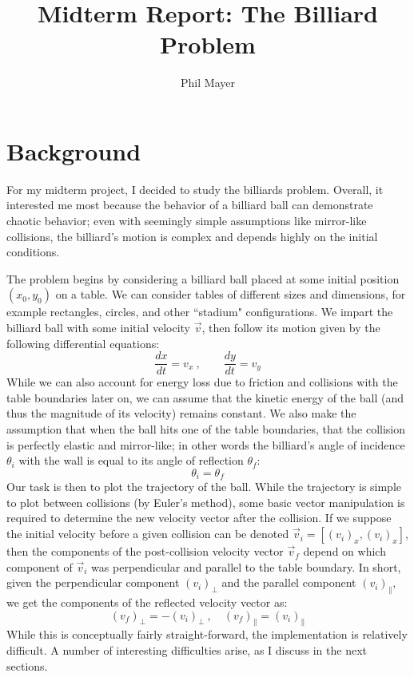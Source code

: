 \documentclass[12pt]{amsart}
\title{Midterm Report: The Billiard Problem}
\author{Phil Mayer}
\begin{document}
\maketitle

\section{Background}
For my midterm project, I decided to study the billiards problem. Overall, it interested me most because the behavior of a billiard ball can
demonstrate chaotic behavior; even with seemingly simple assumptions like mirror-like collisions, the billiard's motion is complex and depends
highly on the initial conditions. 

The problem begins by considering a billiard ball placed at some initial position $(x_0, y_0)$ on a table. We can consider tables of different sizes
and dimensions, for example rectangles, circles, and other ``stadium" configurations. We impart the billiard ball with some initial velocity 
$\vec{v}$, then follow its motion given by the following differential equations:
\[
	\frac{dx}{dt} = v_x \: , \qquad
	\frac{dy}{dt} = v_y
\]
\newline
While we can also account for energy loss due to friction and collisions with the table boundaries later on, we can assume that the kinetic
energy of the ball (and thus the magnitude of its velocity) remains constant. We also make the assumption that when the ball hits one of the
table boundaries, that the collision is perfectly elastic and mirror-like; in other words the billiard's angle of incidence $\theta_i$ with the wall is
equal to its angle of reflection $\theta_f$:
\[
	\theta_i = \theta_f
\]
\newline
Our task is then to plot the trajectory of the ball. While the trajectory is simple to plot between collisions (by Euler's method), some basic vector
manipulation is required to determine the new velocity vector after the collision. If we suppose the initial velocity before a given collision
can be denoted $\vec{v}_i = [ (v_i)_x, (v_i)_x ]$, then the components of the post-collision velocity vector $\vec{v}_f$ depend on which 
component of $\vec{v}_i$ was perpendicular and parallel to the table boundary. In short, given the perpendicular component $(v_i)_\perp$ and
the parallel component $(v_i)_\parallel$, we get the components of the reflected velocity vector as:
\[
	(v_f)_\perp = - (v_i)_\perp \: , \quad (v_f)_\parallel = (v_i)_\parallel
\]
While this is conceptually fairly straight-forward, the implementation is relatively difficult. A number of interesting difficulties arise, as I discuss in
the next sections.
\end{document}
